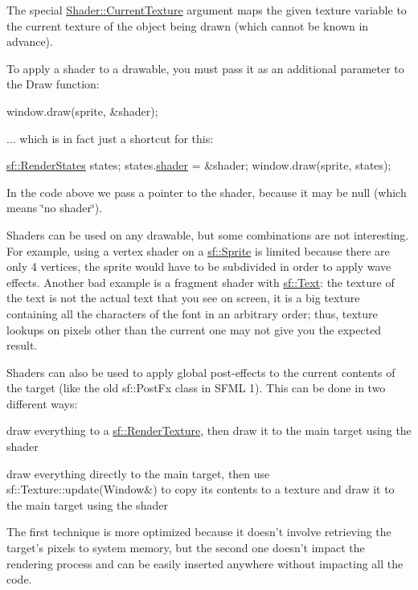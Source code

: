 The special \hyperlink{classsf_1_1_shader_ad679e434fc4f1a1af65f3815b2310fb5}{Shader\-::\-Current\-Texture} argument maps the given texture variable to the current texture of the object being drawn (which cannot be known in advance).

To apply a shader to a drawable, you must pass it as an additional parameter to the Draw function\-: 
\begin{DoxyCode}
window.draw(sprite, &shader);
\end{DoxyCode}


... which is in fact just a shortcut for this\-: 
\begin{DoxyCode}
\hyperlink{classsf_1_1_render_states}{sf::RenderStates} states;
states.\hyperlink{classsf_1_1_render_states_a30e00c9f28ca246ae73119975255ebd0}{shader} = &shader;
window.draw(sprite, states);
\end{DoxyCode}


In the code above we pass a pointer to the shader, because it may be null (which means \char`\"{}no shader\char`\"{}).

Shaders can be used on any drawable, but some combinations are not interesting. For example, using a vertex shader on a \hyperlink{classsf_1_1_sprite}{sf\-::\-Sprite} is limited because there are only 4 vertices, the sprite would have to be subdivided in order to apply wave effects. Another bad example is a fragment shader with \hyperlink{classsf_1_1_text}{sf\-::\-Text}\-: the texture of the text is not the actual text that you see on screen, it is a big texture containing all the characters of the font in an arbitrary order; thus, texture lookups on pixels other than the current one may not give you the expected result.

Shaders can also be used to apply global post-\/effects to the current contents of the target (like the old sf\-::\-Post\-Fx class in S\-F\-M\-L 1). This can be done in two different ways\-: \begin{DoxyItemize}
\item draw everything to a \hyperlink{classsf_1_1_render_texture}{sf\-::\-Render\-Texture}, then draw it to the main target using the shader \item draw everything directly to the main target, then use sf\-::\-Texture\-::update(\-Window\&) to copy its contents to a texture and draw it to the main target using the shader\end{DoxyItemize}
The first technique is more optimized because it doesn't involve retrieving the target's pixels to system memory, but the second one doesn't impact the rendering process and can be easily inserted anywhere without impacting all the code.

